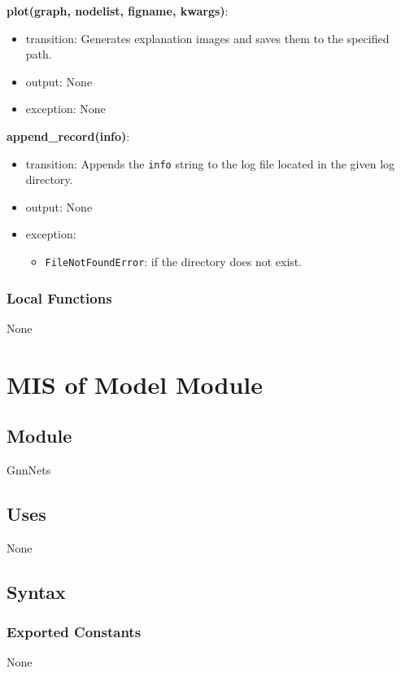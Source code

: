 \documentclass[12pt, titlepage]{article}
\begin{document}
\noindent \textbf{plot(graph, nodelist, figname, kwargs)}:
\begin{itemize}
  \item transition: Generates explanation images and saves them to the specified path.
  \item output: None
  \item exception: None
\end{itemize}


\noindent \textbf{append\_record(info)}:
\begin{itemize}
  \item transition: Appends the \texttt{info} string to the log file located in the given log directory.
  \item output: None
  \item exception: 
  \begin{itemize}
    \item \texttt{FileNotFoundError}: if the directory does not exist.
  \end{itemize}
\end{itemize}



\subsubsection{Local Functions}
None









\section{MIS of Model Module} \label{Model}

\subsection{Module}
GnnNets

\subsection{Uses}
None

\subsection{Syntax}

\subsubsection{Exported Constants}
None
\end{document}
